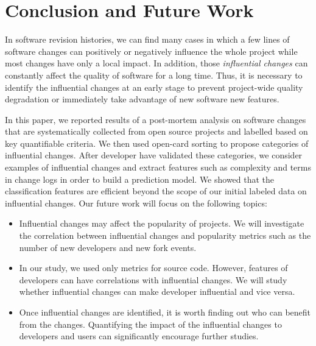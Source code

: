 \section{Conclusion and Future Work}
\label{sec:conclusion}

In software revision histories, we can find many cases in which a few lines of
software changes can positively or negatively influence the whole project
while most changes have only a local impact. In addition, those
\emph{influential changes} can constantly affect the quality of software for a
long time. Thus, it is necessary to identify the influential changes at an
early stage to prevent project-wide quality degradation or immediately
take advantage of new software new features.

In this paper, we reported results of a post-mortem analysis on \numChanges
software changes that are systematically collected from \numSubjects open
source projects  and labelled based on key quantifiable criteria. We then
used open-card sorting to propose categories of influential changes.
After developer have validated these categories, we consider examples of
influential changes and extract features such as 
complexity and terms in change logs in order to build a prediction model.
We showed that the classification features are efficient beyond the scope
of our initial labeled data on influential changes. 
Our future work will focus on the following topics: 

\begin{itemize}
  \item Influential changes may affect the popularity of projects. We will
  investigate the correlation between influential changes and popularity metrics
  such as the number of new developers and new fork events.
  \item In our study, we used only metrics for source code. However, features of
  developers can have correlations with influential changes. We will study
  whether influential changes can make developer influential and vice versa.
  \item Once influential changes are identified, it is worth finding out who can
  benefit from the changes. Quantifying the impact of the influential changes to
  developers and users can significantly encourage further studies.
\end{itemize}
